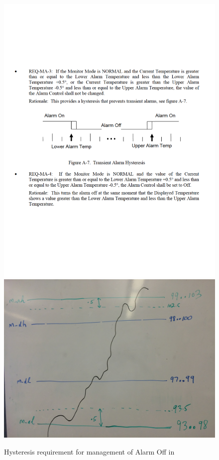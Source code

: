 \begin{figure}[htbp]
\begin{mdframed}
\begin{center}
\includegraphics[width=.9\textwidth]{pics/hysteresis.pdf}
\includegraphics[width=.9\textwidth]{pics/hysteresis.jpg}
\end{center}
\end{mdframed}
\caption{Hysteresis requirement for management of Alarm Off in \cite{REMH}}
\label{fig:hys}
\end{figure}

